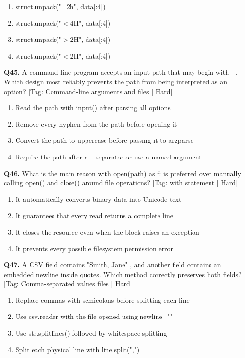 \begin{enumerate}[label=(\alph*),topsep=2pt,itemsep=1pt,partopsep=0pt,parsep=0pt]
    \item {struct.unpack("=2h", data[:4])}
    \item {struct.unpack("$<$4H", data[:4])}
    \item {struct.unpack("$>$2H", data[:4])}
    \item {struct.unpack("$<$2H", data[:4])}
\end{enumerate}
\vspace{2mm}
\noindent\textbf{Q45.} A command-line program accepts an input path that may begin with - . Which design most reliably prevents the path from being interpreted as an option? \hfill [Tag: Command-line arguments and files | Hard]
\begin{enumerate}[label=(\alph*),topsep=2pt,itemsep=1pt,partopsep=0pt,parsep=0pt]
    \item {Read the path with input() after parsing all options}
    \item {Remove every hyphen from the path before opening it}
    \item {Convert the path to uppercase before passing it to argparse}
    \item {Require the path after a -- separator or use a named argument}
\end{enumerate}
\vspace{2mm}
\noindent\textbf{Q46.} What is the main reason with open(path) as f: is preferred over manually calling open() and close() around file operations? \hfill [Tag: with statement | Hard]
\begin{enumerate}[label=(\alph*),topsep=2pt,itemsep=1pt,partopsep=0pt,parsep=0pt]
    \item {It automatically converts binary data into Unicode text}
    \item {It guarantees that every read returns a complete line}
    \item {It closes the resource even when the block raises an exception}
    \item {It prevents every possible filesystem permission error}
\end{enumerate}
\vspace{2mm}
\noindent\textbf{Q47.} A CSV field contains "Smith, Jane" , and another field contains an embedded newline inside quotes. Which method correctly preserves both fields? \hfill [Tag: Comma-separated values files | Hard]
\begin{enumerate}[label=(\alph*),topsep=2pt,itemsep=1pt,partopsep=0pt,parsep=0pt]
    \item {Replace commas with semicolons before splitting each line}
    \item {Use csv.reader with the file opened using newline=""}
    \item {Use str.splitlines() followed by whitespace splitting}
    \item {Split each physical line with line.split(",")}
\end{enumerate}
